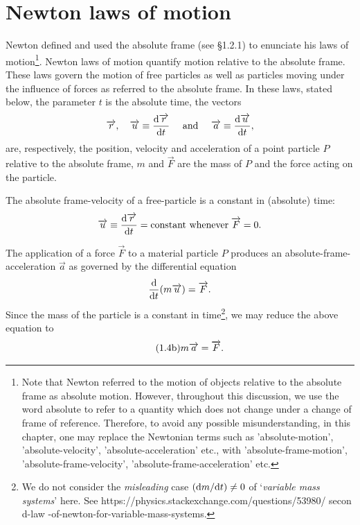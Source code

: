 \section{Newton laws of motion} 
 Newton defined and used 
the absolute frame (see \S 1.2.1) to enunciate his 
laws of motion\footnote{Note that Newton referred to 
the motion of objects relative to the absolute frame 
as {absolute motion}. However, throughout this 
discussion, we use the word absolute to refer to a 
quantity which does not change under a change of frame 
of reference. Therefore, to avoid any possible 
misunderstanding, in this chapter, one may replace the 
Newtonian terms such as 'absolute-motion', 
'absolute-velocity', 'absolute-acceleration' etc., 
with 
'absolute-frame-motion', 'absolute-frame-velocity', 
'absolute-frame-acceleration' etc.}. Newton laws of 
motion quantify  motion relative to the absolute 
frame. 
These laws govern the motion of free 
particles as well as particles moving under the 
influence of forces as referred to the absolute frame. 
In these laws, stated below, the parameter $t$ is the 
absolute time, the vectors
\begin{align*}
\overrightarrow{r},\quad \overrightarrow{u}\equiv \frac{\mathrm{d}{\overrightarrow{r}}}{\mathrm{d}{t}}\quad \text{
and }\quad \overrightarrow{a} \equiv \frac{\mathrm{d}{\overrightarrow{u}}}{\mathrm{d}{t}},
\end{align*}
are, respectively, the position, velocity and 
acceleration
of a point particle $P$ relative to the absolute frame, 
$m
$ and $\vec{F} $ are the mass of $P$ and the force 
acting
on the particle.

 The absolute frame-velocity of a 
free-particle is a constant in (absolute) time:
\begin{align}\label{gr.3}
\overrightarrow{u}\equiv \frac{\mathrm{d}{\overrightarrow{r}}}{\mathrm{d}{t}} = \text{constant 
whenever} 
\; \overrightarrow{F}=0.
\end{align}

 The application of a force $\vec{F}$ 
to a material particle $P$ produces an 
absolute-frame-acceleration $\vec{a}$ as governed by 
the differential equation
\begin{align}\label{gr.4}
\frac{\mathrm{d}{}}{\mathrm{d}{t}}(m\overrightarrow{u}) =\overrightarrow{F}.
\end{align}
Since the mass of the particle is a constant in 
time\footnote{We do not consider the 
\textsl{misleading} case $(\mathrm{d}{m} / \mathrm{d}{t})\neq 0$ of 
`\textsl{variable mass systems}' here. See 
https://physics.stackexchange.com/questions/53980/
secon 
d-law -of-newton-for-variable-mass-systems.}, we may 
reduce the above equation to
\begin{align}\tag{{1.4b}}
m\vec{a}=\vec{F}.
\end{align}

